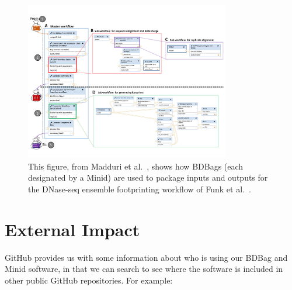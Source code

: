 \documentclass[11pt]{article}
\begin{document}
\begin{figure}
\centering
\includegraphics[width=0.8\textwidth,trim=0.1in 0.4in 0in 0.6in,clip]{figs/Fig4-02-20}
\caption{This figure, from Madduri et al.~\cite{madduri2018reproducible}, 
shows how BDBags (each designated by a Minid) are used to package inputs and outputs for the
 DNase-seq ensemble footprinting workflow of Funk et al.~\cite{funk18}.
\label{fig:5}}
\end{figure}


\section{External Impact}

GitHub provides us with some information about who is using our BDBag and Minid software,
in that we can search to see where the software is included in other public GitHub repositories. 
For example:
\end{document}
